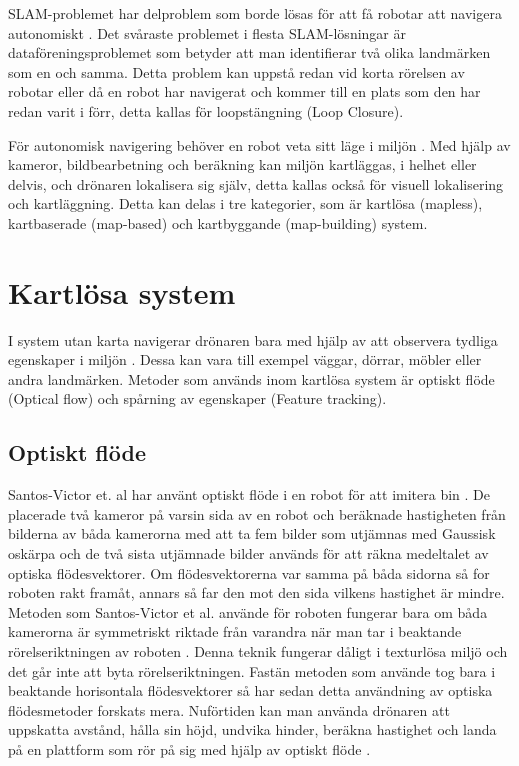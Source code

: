SLAM-problemet har delproblem som borde lösas för att få robotar att navigera autonomiskt \citep{slamproblem}. Det svåraste problemet i flesta SLAM-lösningar är dataföreningsproblemet som betyder att man identifierar två olika landmärken som en och samma. Detta problem kan uppstå redan vid korta rörelsen av robotar eller då en robot har navigerat och kommer till en plats som den har redan varit i förr, detta kallas för loopstängning (Loop Closure). 

För autonomisk navigering behöver en robot veta sitt läge i miljön \citep{geospatial}. Med hjälp av kameror, bildbearbetning och beräkning kan miljön kartläggas, i helhet eller delvis, och drönaren lokalisera sig själv, detta kallas också för visuell lokalisering och kartläggning. Detta kan delas i tre kategorier, som är kartlösa (mapless), kartbaserade (map-based) och kartbyggande (map-building) system. 

\section{Kartlösa system}

I system utan karta navigerar drönaren bara med hjälp av att observera tydliga egenskaper i miljön \citep{982903}. Dessa kan vara till exempel väggar, dörrar, möbler eller andra landmärken. Metoder som används inom kartlösa system är optiskt flöde (Optical flow) och spårning av egenskaper (Feature tracking). 

\subsection{Optiskt flöde}

Santos-Victor et. al har använt optiskt flöde i en robot för att imitera bin \citep{341094}. De placerade två kameror på varsin sida av en robot och beräknade hastigheten från bilderna av båda kamerorna med att ta fem bilder som utjämnas med Gaussisk oskärpa och de två sista utjämnade bilder används för att räkna medeltalet av optiska flödesvektorer. Om flödesvektorerna var samma på båda sidorna så for roboten rakt framåt, annars så far den mot den sida vilkens hastighet är mindre. Metoden som Santos-Victor et al. använde för roboten fungerar bara om båda kamerorna är symmetriskt riktade från varandra när man tar i beaktande rörelseriktningen av roboten \citep{982903}. Denna teknik fungerar dåligt i texturlösa miljö och det går inte att byta rörelseriktningen. Fastän metoden som \cite{341094} använde tog bara i beaktande horisontala flödesvektorer så har sedan detta användning av optiska flödesmetoder forskats mera. Nuförtiden kan man använda drönaren att uppskatta avstånd, hålla sin höjd, undvika hinder, beräkna hastighet och landa på en plattform som rör på sig med hjälp av optiskt flöde \citep{6564752}.

